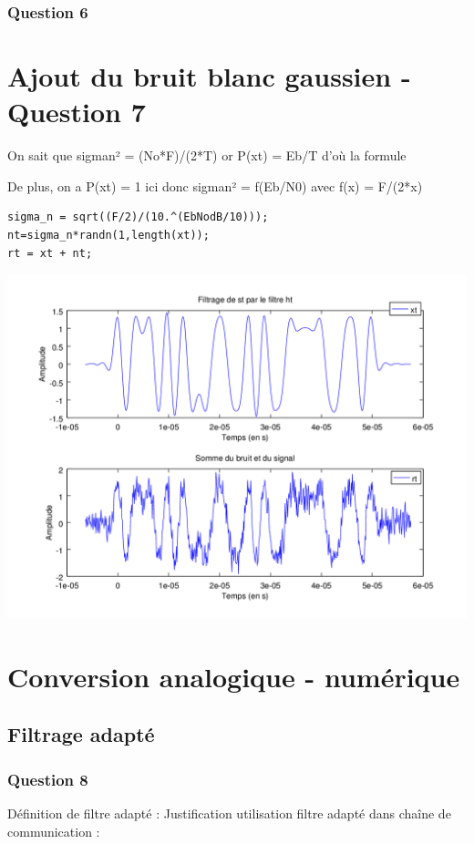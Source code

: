 \documentclass{acm_proc_article-sp}
\begin{document}
\subsubsection{Question 6}


\section{Ajout du bruit blanc gaussien - Question 7}

On sait que sigman² = (No*F)/(2*T)
or P(xt) = Eb/T d'où la formule

De plus, on a P(xt) = 1 ici donc sigman² = f(Eb/N0) avec f(x) = F/(2*x)

\begin{lstlisting}
sigma_n = sqrt((F/2)/(10.^(EbNodB/10)));
nt=sigma_n*randn(1,length(xt));
rt = xt + nt;
\end{lstlisting}

\begin{center}
\includegraphics[scale=0.45]{signalBruite_7.png}
\end{center}


\section{Conversion analogique - numérique}
\subsection{Filtrage adapté}
\subsubsection{Question 8}
Définition de filtre adapté : 
Justification utilisation filtre adapté dans chaîne de communication :
\end{document}
